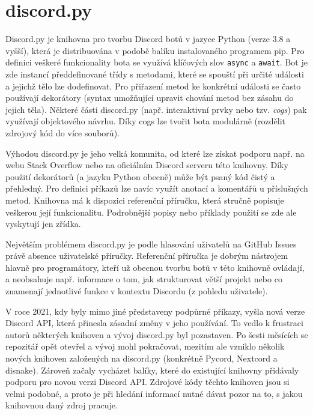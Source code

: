 \documentclass[FM]{tulthesis}
\begin{document}
	\section{discord.py}
	
	Discord.py je knihovna pro tvorbu Discord botů v jazyce Python (verze 3.8 a vyšší), která je distribuována v podobě balíku instalovaného programem pip. Pro definici veškeré funkcionality bota se využívá klíčových slov \verb*|async| a \verb*|await|. Bot je zde instancí předdefinované třídy s metodami, které se spouští při určité události a jejichž tělo lze dodefinovat. Pro přiřazení metod ke konkrétní události se často používají dekorátory (syntax umožňující upravit chování metod bez zásahu do jejich těla). Některé části discord.py (např. interaktivní prvky nebo tzv. \textit{cogs}) pak využívají objektového návrhu. Díky cogs lze tvořit bota modulárně (rozdělit zdrojový kód do více souborů).
	
	Výhodou discord.py je jeho velká komunita, od které lze získat podporu např. na webu Stack Overflow nebo na oficiálním Discord serveru této knihovny. Díky použití dekorátorů (a jazyku Python obecně) může být psaný kód čistý a přehledný. Pro definici příkazů lze navíc využít anotací a komentářů u příslušných metod. Knihovna má k dispozici referenční příručku, která stručně popisuje veškerou její funkcionalitu. Podrobnější popisy nebo příklady použití se zde ale vyskytují jen zřídka.
	
	Největším problémem discord.py je podle hlasování uživatelů na GitHub \mbox{Issues} právě absence uživatelské příručky. Referenční příručka je dobrým nástrojem hlavně pro programátory, kteří už obecnou tvorbu botů v této knihovně ovládají, a neobsahuje např. informace o tom, jak strukturovat větší projekt nebo co znamenají jednotlivé funkce v kontextu Discordu (z pohledu uživatele).
	
	V roce 2021, kdy byly mimo jiné představeny podpůrné příkazy, vyšla nová verze Discord API, která přinesla zásadní změny v jeho používání. To vedlo k frustraci autorů některých knihoven a vývoj discord.py byl pozastaven. Po šesti měsících se repozitář opět otevřel a vývoj mohl pokračovat, mezitím ale vzniklo několik nových knihoven založených na discord.py (konkrétně Pycord, Nextcord a disnake). Zároveň začaly vycházet balíky, které do existující knihovny přidávaly podporu pro novou verzi Discord API. Zdrojové kódy těchto knihoven jsou si velmi podobné, a proto je při hledání informací nutné dávat pozor na to, s jakou knihovnou daný zdroj pracuje.
	
\end{document}
